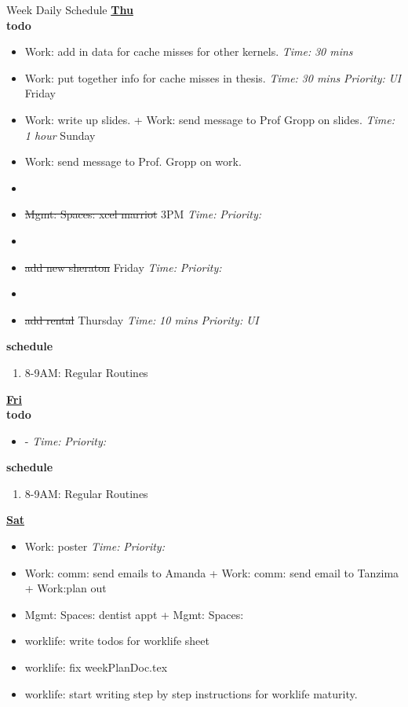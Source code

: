\documentclass[serif, mathserif, final]{beamer}
\newcommand{\doneTask}[1]{\item \sout{#1}}
\newcommand{\timeEst}[1]{\textit{Time:} \textit{#1}}
\newcommand{\priority}[1]{\textit{Priority:} \textit{#1}}
\newcommand{\deadline}[1]{#1}
\begin{document}
\begin{frame}{}
\begin{columns}
\begin{column}{0.50\linewidth}
\begin{block}{Week Daily Schedule}
  \textbf{\small{\underline{Thu}}} \\
  \textbf{\small todo} 
  \begin{itemize} 
    \tiny \item \tiny Work: add in data for cache  misses for other kernels. \timeEst{30 mins} 
  \item \tiny Work: put together info for cache  misses in thesis.  \timeEst{30 mins}  \priority{UI} \deadline{Friday} 
  \item \tiny Work: write up slides. + Work: send message to Prof Gropp on slides.  \timeEst{1 hour} \deadline{Sunday}
  \item \tiny Work: send message to Prof. Gropp on work. 
  \item \tiny \doneTask{Mgmt: Spaces: xcel marriot} \deadline{3PM}   \timeEst{}  \priority{} 
  \item \tiny \doneTask{add new sheraton} \deadline{Friday}   \timeEst{}  \priority{} 
  \item \tiny \doneTask{add rental} \deadline{Thursday} \timeEst{10 mins} \priority{UI} 
  \end{itemize}  
  \textbf{\small schedule}
  \begin{enumerate} 
    \tiny \item \tiny 8-9AM: Regular Routines 
  \end{enumerate}  



  \textbf{\small {\underline{Fri}}}\\
  \textbf{\small todo} 
  \begin{itemize} 
    \tiny \item \tiny -  \deadline{ }   \timeEst{}  \priority{} 
  \end{itemize} 
  \textbf{\small schedule} 
  \begin{enumerate} 
    \tiny \item \tiny 8-9AM: Regular Routines 
  \end{enumerate} 

\textbf{\small \underline{Sat}} 
\begin{itemize} 
\item \tiny Work: poster  \deadline{  }  \timeEst{   }  \priority{ } 
\item \tiny Work: comm:  send emails  to Amanda + Work: comm: send email to Tanzima  + Work:plan out 
\item \tiny Mgmt: Spaces: dentist appt  + Mgmt: Spaces: 
\item \tiny worklife: write todos for worklife sheet 
\item \tiny worklife: fix weekPlanDoc.tex 
\item \tiny worklife: start writing step by step instructions for worklife maturity. 


\end{itemize}
\end{block}
\end{column}
\end{columns}
\end{frame}
\end{document}
